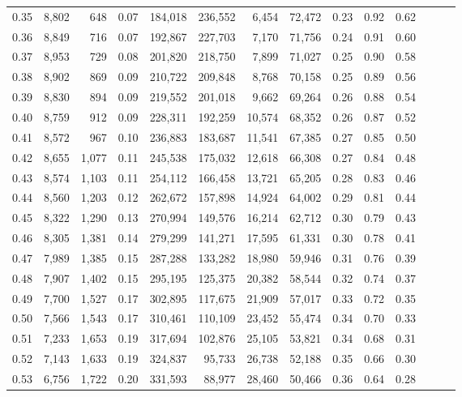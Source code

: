 \begin{tabular}{rrrrrrrrrrrrrr}
0.35 &  8,802 &    648 &  0.07 &  184,018 &  236,552 &   6,454 &  72,472 &  0.23 &  0.92 &      0.62 \\
0.36 &  8,849 &    716 &  0.07 &  192,867 &  227,703 &   7,170 &  71,756 &  0.24 &  0.91 &      0.60 \\
0.37 &  8,953 &    729 &  0.08 &  201,820 &  218,750 &   7,899 &  71,027 &  0.25 &  0.90 &      0.58 \\
0.38 &  8,902 &    869 &  0.09 &  210,722 &  209,848 &   8,768 &  70,158 &  0.25 &  0.89 &      0.56 \\
0.39 &  8,830 &    894 &  0.09 &  219,552 &  201,018 &   9,662 &  69,264 &  0.26 &  0.88 &      0.54 \\
0.40 &  8,759 &    912 &  0.09 &  228,311 &  192,259 &  10,574 &  68,352 &  0.26 &  0.87 &      0.52 \\
0.41 &  8,572 &    967 &  0.10 &  236,883 &  183,687 &  11,541 &  67,385 &  0.27 &  0.85 &      0.50 \\
0.42 &  8,655 &  1,077 &  0.11 &  245,538 &  175,032 &  12,618 &  66,308 &  0.27 &  0.84 &      0.48 \\
0.43 &  8,574 &  1,103 &  0.11 &  254,112 &  166,458 &  13,721 &  65,205 &  0.28 &  0.83 &      0.46 \\
0.44 &  8,560 &  1,203 &  0.12 &  262,672 &  157,898 &  14,924 &  64,002 &  0.29 &  0.81 &      0.44 \\
0.45 &  8,322 &  1,290 &  0.13 &  270,994 &  149,576 &  16,214 &  62,712 &  0.30 &  0.79 &      0.43 \\
0.46 &  8,305 &  1,381 &  0.14 &  279,299 &  141,271 &  17,595 &  61,331 &  0.30 &  0.78 &      0.41 \\
0.47 &  7,989 &  1,385 &  0.15 &  287,288 &  133,282 &  18,980 &  59,946 &  0.31 &  0.76 &      0.39 \\
0.48 &  7,907 &  1,402 &  0.15 &  295,195 &  125,375 &  20,382 &  58,544 &  0.32 &  0.74 &      0.37 \\
0.49 &  7,700 &  1,527 &  0.17 &  302,895 &  117,675 &  21,909 &  57,017 &  0.33 &  0.72 &      0.35 \\
0.50 &  7,566 &  1,543 &  0.17 &  310,461 &  110,109 &  23,452 &  55,474 &  0.34 &  0.70 &      0.33 \\
0.51 &  7,233 &  1,653 &  0.19 &  317,694 &  102,876 &  25,105 &  53,821 &  0.34 &  0.68 &      0.31 \\
0.52 &  7,143 &  1,633 &  0.19 &  324,837 &   95,733 &  26,738 &  52,188 &  0.35 &  0.66 &      0.30 \\
0.53 &  6,756 &  1,722 &  0.20 &  331,593 &   88,977 &  28,460 &  50,466 &  0.36 &  0.64 &      0.28 \\

\end{tabular}
